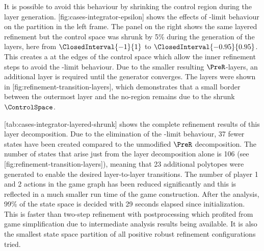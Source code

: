
    It is possible to avoid this behaviour by shrinking the control region during the layer generation.
    [fig:cases-integrator-epsilon] shows the effects of \epsilon-limit behaviour on the partition in the left frame.
    The panel on the right shows the same layered refinement but the control space was shrunk by 5\% during the generation of the layers, here from $\ClosedInterval{-1}{1}$ to $\ClosedInterval{-0.95}{0.95}$.
    This creates a  at the edges of the control space which allow the inner refinement steps to avoid the \epsilon-limit behaviour.
    Due to the smaller resulting $\PreR$-layers, an additional layer is required until the generator converges.
    The layers were shown in [fig:refinement-transition-layers], which demonstrates that a small border between the outermost layer and the no-region remains due to the shrunk $\ControlSpace$.

    [tab:cases-integrator-layered-shrunk] shows the complete refinement results of this layer decomposition.
    Due to the elimination of the \epsilon-limit behaviour, 37 fewer states have been created compared to the unmodified $\PreR$ decomposition.
    The number of states that arise just from the layer decomposition alone is 106 (see [fig:refinement-transition-layers]), meaning that 23 additional polytopes were generated to enable the desired layer-to-layer transitions.
    The number of player 1 and 2 actions in the game graph has been reduced significantly and this is reflected in a much smaller run time of the game construction.
    After the analysis, 99\% of the state space is decided with 29 seconds elapsed since initialization.
    This is faster than two-step refinement with postprocessing which profited from game simplification due to intermediate analysis results being available.
    It is also the smallest state space partition of all positive robust refinement configurations tried.

